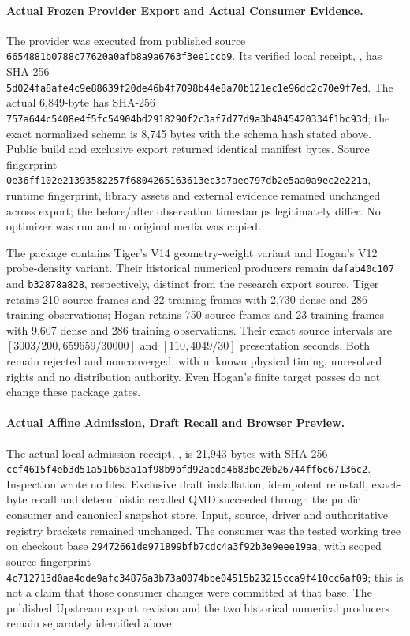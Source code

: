 \documentclass[11pt,letterpaper]{article}
\newcommand{\code}[1]{\nolinkurl{#1}}
\newcommand{\hash}[1]{{\footnotesize\nolinkurl{#1}}}
\begin{document}
\paragraph{Actual Frozen Provider Export and Actual Consumer Evidence.}
The provider was executed from published source
\code{6654881b0788c77620a0afb8a9a6763f3ee1ccb9}. Its verified local receipt,
, has SHA-256
\hash{5d024fa8afe4c9e88639f20de46b4f7098b44e8a70b121ec1e96dc2c70e9f7ed}.
The actual 6,849-byte  has SHA-256
\hash{757a644c5408e4f5fc54904bd2918290f2c3af7d77d9a3b4045420334f1bc93d};
the exact normalized schema is 8,745 bytes with the schema hash stated above.
Public build and exclusive export returned identical manifest bytes. Source
fingerprint
\hash{0e36ff102e21393582257f6804265163613ec3a7aee797db2e5aa0a9ec2e221a},
runtime fingerprint, library assets and external evidence remained unchanged
across export; the before/after observation timestamps legitimately differ.
No optimizer was run and no original media was copied.

The package contains Tiger's V14 geometry-weight variant and Hogan's V12
probe-density variant. Their historical numerical producers remain
\code{dafab40c107} and \code{b32878a828}, respectively, distinct from the research
export source. Tiger retains 210 source frames and 22 training frames with
2,730 dense and 286 training observations; Hogan retains 750 source frames
and 23 training frames with 9,607 dense and 286 training observations.
Their exact source intervals are $[3003/200,659659/30000]$ and
$[110,4049/30]$ presentation seconds. Both remain rejected and nonconverged,
with unknown physical timing, unresolved rights and no distribution authority.
Even Hogan's finite target passes do not change these package gates.

\paragraph{Actual Affine Admission, Draft Recall and Browser Preview.}
The actual local admission receipt,
, is 21,943 bytes with SHA-256
\hash{ccf4615f4eb3d51a51b6b3a1af98b9bfd92abda4683be20b26744ff6c67136c2}.
Inspection wrote no files. Exclusive draft installation, idempotent reinstall,
exact-byte recall and deterministic recalled QMD succeeded through the public
consumer and canonical snapshot store. Input, source, driver and authoritative
registry brackets remained unchanged. The consumer was the tested working tree
on checkout base \code{29472661de971899bfb7cdc4a3f92b3e9eee19aa}, with scoped
source fingerprint
\hash{4c712713d0aa4dde9afc34876a3b73a0074bbe04515b23215cca9f410cc6af09};
this is not a claim that those consumer changes were committed at that base.
The published Upstream export revision and the two historical numerical
producers remain separately identified above.
\end{document}
